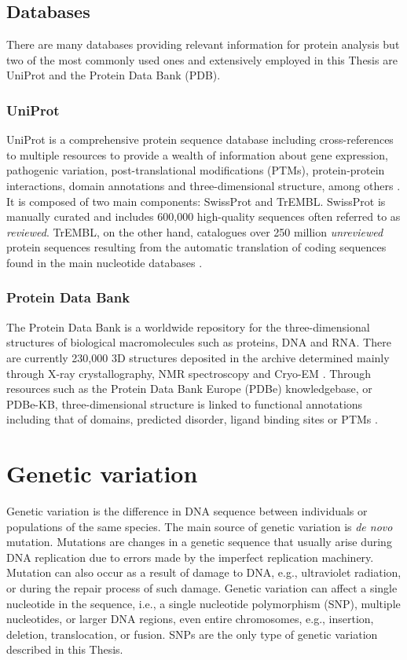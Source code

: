 \subsection{Databases}

There are many databases providing relevant information for protein analysis but two of the most commonly used ones and extensively employed in this Thesis are UniProt and the Protein Data Bank (PDB).

\subsubsection{UniProt}

UniProt is a comprehensive protein sequence database including cross-references to multiple resources to provide a wealth of information about gene expression, pathogenic variation, post-translational modifications (PTMs), protein-protein interactions, domain annotations and three-dimensional structure, among others \cite{BAIROCH_2005_UNIPROT}. It is composed of two main components: SwissProt and TrEMBL. SwissProt is manually curated and includes 600,000 high-quality sequences often referred to as \textit{reviewed}. TrEMBL, on the other hand, catalogues over 250 million \textit{unreviewed} protein sequences resulting from the automatic translation of coding sequences found in the main nucleotide databases \cite{BAIROCH_2000_UNIPROT}.

\subsubsection{Protein Data Bank}

The Protein Data Bank is a worldwide repository for the three-dimensional structures of biological macromolecules such as proteins, DNA and RNA. There are currently 230,000 3D structures deposited in the archive determined mainly through X-ray crystallography, NMR spectroscopy and Cryo-EM \cite{BERMAN_2003_PDB}. Through resources such as the Protein Data Bank Europe (PDBe) knowledgebase, or PDBe-KB, three-dimensional structure is linked to functional annotations including that of domains, predicted disorder, ligand binding sites or PTMs \cite{PDBEKB_2019_PDBEKB}.

\section{Genetic variation}

Genetic variation is the difference in DNA sequence between individuals or populations of the same species. The main source of genetic variation is \textit{de novo} mutation. Mutations are changes in a genetic sequence that usually arise during DNA replication due to errors made by the imperfect replication machinery. Mutation can also occur as a result of damage to DNA, e.g., ultraviolet radiation, or during the repair process of such damage. Genetic variation can affect a single nucleotide in the sequence, i.e., a single nucleotide polymorphism (SNP), multiple nucleotides, or larger DNA regions, even entire chromosomes, e.g., insertion, deletion, translocation, or fusion. SNPs are the only type of genetic variation described in this Thesis.

